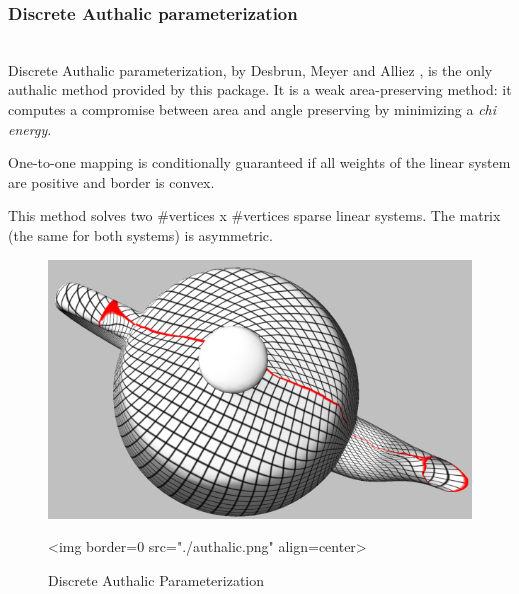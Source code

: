 \subsubsection{Discrete Authalic parameterization}

  \\

Discrete Authalic parameterization, by Desbrun, Meyer and Alliez
\cite{cgal:dma-ipsm-02}, is the only authalic method provided
by this package. It is a weak area-preserving method:
it computes a compromise between area and angle preserving by
minimizing a {\em chi energy}.

One-to-one mapping is conditionally guaranteed if all weights
of the linear system are positive and border is convex.

This method solves two \#vertices x \#vertices sparse linear systems. The matrix
(the same for both systems) is asymmetric.

\begin{figure}[bht]
    \begin{center}
        \begin{ccTexOnly}
            \includegraphics{Parameterization/authalic} %
        \end{ccTexOnly}
        \begin{ccHtmlOnly}
            <img border=0 src="./authalic.png" align=center>
        \end{ccHtmlOnly}
        \label{parameterization-fig-authalic}

        \caption{Discrete Authalic Parameterization}
    \end{center}
\end{figure}


